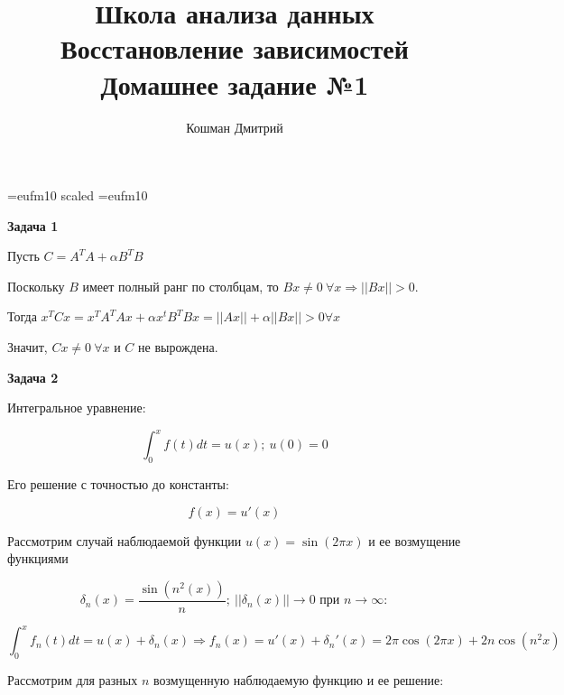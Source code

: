 \documentclass[10pt]{article}
\title{Школа анализа данных\\ Восстановление зависимостей \\Домашнее задание №1}
\author{Кошман Дмитрий}
\date{}
\begin{document}
	
	
	\voffset=-20mm
	\hoffset=-17mm
	\font\Got=eufm10 scaled \font\Got=eufm10
	
	
	\maketitle
	
	\bigskip
	
	\textbf{Задача 1}
	\medskip
	
	Пусть $C = A^TA + \alpha B^T B$
	
	Поскольку $B$ имеет полный ранг по столбцам, то $Bx \neq 0 \medspace \forall x \Rightarrow ||Bx||  > 0$.
	
	Тогда $x^TCx = x^TA^TAx + \alpha x^tB^T Bx = || Ax || + \alpha || Bx ||  > 0 \forall x$
	
	Значит, $Cx \neq 0 \medspace \forall x$ и $C$ не вырождена.
	
	\bigskip
	
		\textbf{Задача 2}
		
	\medskip
	
	Интегральное уравнение:
	
	$$ \int_{0}^{x}f(t)dt = u(x) ; \medspace u(0) = 0$$
	
	Его решение с точностью до константы:
	
	$$f(x) = u'(x)$$
	
	Рассмотрим случай наблюдаемой функции $u(x)=\sin(2\pi x)$ и ее возмущение функциями
	
	$$\delta_n (x) = \frac {\sin(n^2(x))}{n}; \medspace ||\delta_n(x)|| \rightarrow 0 \text{ при } n \rightarrow \infty :$$
	
	$$ \int_{0}^{x}f_n(t)dt = u(x) + \delta_n(x) \Rightarrow f_n(x) = u'(x)  + \delta_n'(x) = 2\pi \cos(2\pi x) + 2n\cos(n^2 x)$$
	
	Рассмотрим для разных $n$ возмущенную наблюдаемую функцию и ее решение:
\end{document}
